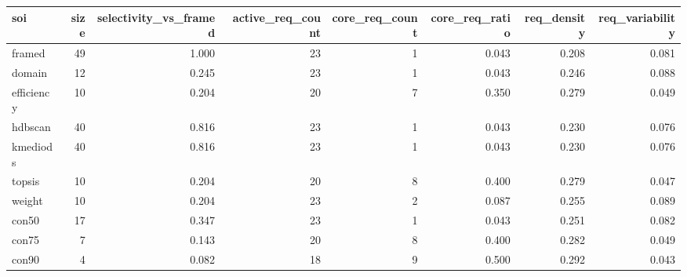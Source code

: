 \begin{tabular}{lrrrrrrr}
\toprule
soi & size & selectivity_vs_framed & active_req_count & core_req_count & core_req_ratio & req_density & req_variability \\
\midrule
framed & 49 & 1.000 & 23 & 1 & 0.043 & 0.208 & 0.081 \\
domain & 12 & 0.245 & 23 & 1 & 0.043 & 0.246 & 0.088 \\
efficiency & 10 & 0.204 & 20 & 7 & 0.350 & 0.279 & 0.049 \\
hdbscan & 40 & 0.816 & 23 & 1 & 0.043 & 0.230 & 0.076 \\
kmediods & 40 & 0.816 & 23 & 1 & 0.043 & 0.230 & 0.076 \\
topsis & 10 & 0.204 & 20 & 8 & 0.400 & 0.279 & 0.047 \\
weight & 10 & 0.204 & 23 & 2 & 0.087 & 0.255 & 0.089 \\
con50 & 17 & 0.347 & 23 & 1 & 0.043 & 0.251 & 0.082 \\
con75 & 7 & 0.143 & 20 & 8 & 0.400 & 0.282 & 0.049 \\
con90 & 4 & 0.082 & 18 & 9 & 0.500 & 0.292 & 0.043 \\
\bottomrule
\end{tabular}
